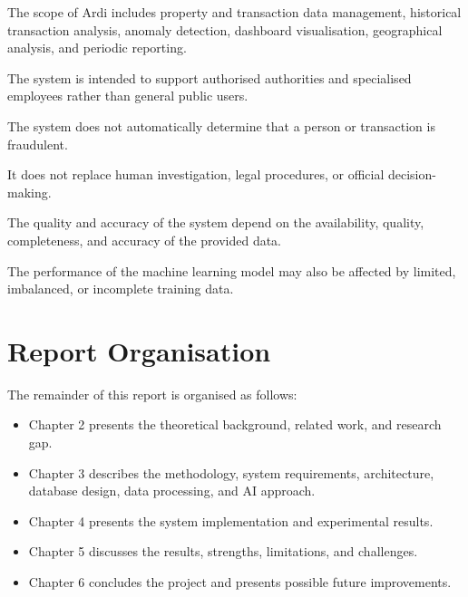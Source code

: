 \documentclass[12pt,a4paper,oneside]{report}
\begin{document}
The scope of Ardi includes property and transaction data management,
historical transaction analysis, anomaly detection, dashboard
visualisation, geographical analysis, and periodic reporting.

The system is intended to support authorised authorities and
specialised employees rather than general public users.

The system does not automatically determine that a person or
transaction is fraudulent.

It does not replace human investigation, legal procedures, or official
decision-making.

The quality and accuracy of the system depend on the availability,
quality, completeness, and accuracy of the provided data.

The performance of the machine learning model may also be affected by
limited, imbalanced, or incomplete training data.

\section{Report Organisation}

The remainder of this report is organised as follows:

\begin{itemize}

    \item Chapter 2 presents the theoretical background, related
    work, and research gap.

    \item Chapter 3 describes the methodology, system requirements,
    architecture, database design, data processing, and AI approach.

    \item Chapter 4 presents the system implementation and
    experimental results.

    \item Chapter 5 discusses the results, strengths, limitations,
    and challenges.

    \item Chapter 6 concludes the project and presents possible
    future improvements.

\end{itemize}

\end{document}
